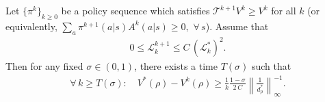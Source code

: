 \begin{theorem}\label{thm:sublinear-upper}
    Let $\{\pi^k\}_{k\geq 0}$ be a policy sequence which satisfies $\mathcal{T}^{k+1}V^k\geq V^k$ for all $k$ \textup{(}or equivalently, $\sum_a\pi^{k+1}(a|s)A^k(a|s)\geq 0,\,\,\forall\, s$\textup{)}.
    Assume that
\begin{align*}
0\leq \mathcal{L}_k^{k+1}\leq C\,\left(\mathcal{L}_k^*\right)^2.
\end{align*}
Then for any fixed $\sigma\in(0,1)$, there exists a time $T(\sigma)$ such that 
\begin{align*}
\forall\,k\geq T(\sigma):\quad V^*(\rho)-V^k(\rho)\geq \frac{1}{k}\frac{1-\sigma}{2\,C}\left\|\frac{1}{d_\rho^*}\right\|_\infty^{-1}.
\end{align*}
\end{theorem}
